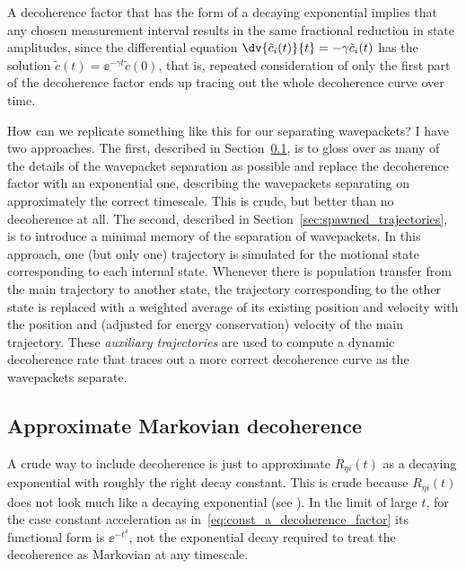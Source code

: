 A decoherence factor that has the form of a decaying exponential implies that any chosen measurement interval results in the same fractional reduction in state amplitudes, since the differential equation $\dv{\tilde c_{i}(t)}{t} = -\gamma \tilde c_i(t)$ has the solution $\tilde c(t) = \ee^{-\gamma t} \tilde c(0)$, that is, repeated consideration of only the first part of the decoherence factor ends up tracing out the whole decoherence curve over time.

How can we replicate something like this for our separating wavepackets? I have two approaches. The first, described in Section~\ref{sec:markovian_decoherence}, is to gloss over as many of the details of the wavepacket separation as possible and replace the decoherence factor with an exponential one, describing the wavepackets separating on approximately the correct timescale. This is crude, but better than no decoherence at all. The second, described in Section~\ref{sec:spawned_trajectories}, is to introduce a minimal memory of the separation of wavepackets. In this approach, one (but only one) trajectory is simulated for the motional state corresponding to each internal state. Whenever there is population transfer from the main trajectory to another state, the trajectory corresponding to the other state is replaced with a weighted average of its existing position and velocity with the position and (adjusted for energy conservation) velocity of the main trajectory. These \emph{auxiliary trajectories} are used to compute a dynamic decoherence rate that traces out a more correct decoherence curve as the wavepackets separate.

\subsection{Approximate Markovian decoherence}\label{sec:markovian_decoherence}

A crude way to include decoherence is just to approximate $R_{\eta i}(t)$ as a decaying exponential with roughly the right decay constant. This is crude because $R_{\eta i}(t)$ does not look much like a decaying exponential (see ). In the limit of large $t$, for the case constant acceleration as in~\eqref{eq:const_a_decoherence_factor} its functional form is $\ee^{-t^4}$, not the exponential decay required to treat the decoherence as Markovian at any timescale.


